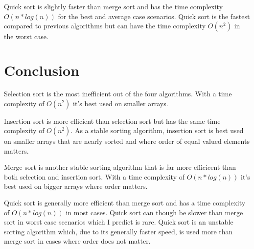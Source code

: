 \documentclass[a4paper,11pt]{article}
\begin{document}
Quick sort is slightly faster than merge sort and has the time complexity
$ O(n*log(n))$ for the best and average case scenarios. Quick sort is
the fastest compared to previous algorithms but can have the time 
complexity $ O(n^2)$ in the worst case. 

\section*{Conclusion}

Selection sort is the most inefficient out of the four algorithms. With 
a time complexity of $ O(n^2)$ it's best used on smaller arrays.

Insertion sort is more efficient than selection sort but has the same
time complexity of $ O(n^2)$. As a stable sorting algorithm, insertion 
sort is best used on smaller arrays that are nearly sorted and where
order of equal valued elements matters.

Merge sort is another stable sorting algorithm that is far more efficicent
than both selection and insertion sort. With a time complexity of 
$ O(n*log(n))$ it's best used on bigger arrays where order matters.

Quick sort is generally more efficient than merge sort and has a time
complexity of $ O(n*log(n))$ in most cases. Quick sort can though be
slower than merge sort in worst case scenarios which I predict is rare.
Quick sort is an unstable sorting algorithm which, due to its generally
faster speed, is used more than merge sort in cases where order does not
matter.
\end{document}
